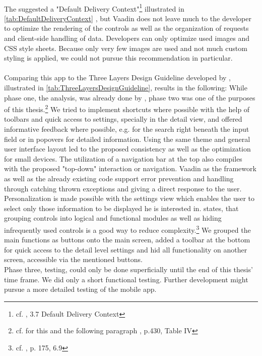 \\
The \cite{WorldWideWebConsortium.2008} suggested a "Default Delivery Context"\footnote{cf. \cite{WorldHealthOrganization.2011}, 3.7 Default Delivery Context} illustrated in \ref{tab:DefaultDeliveryContext} , but Vaadin does not leave much to the developer to optimize the rendering of the controls as well as the organization of requests and client-side handling of data. Developers can only optimize used images and CSS style sheets. Because only very few images are used and not much custom styling is applied, we could not pursue this recommendation in particular.
\\
\\
Comparing this app to the Three Layers Design Guideline developed by \cite{AyobNurulZakiahbinti.2009}, illustrated in \ref{tab:ThreeLayersDesignGuideline}, results in the following: While phase one, the analysis, was already done by \cite{Dehling.2012}, phase two was one of the purposes of this thesis.\footnote{cf. for this and the following paragraph \cite{AyobNurulZakiahbinti.2009}, p.430, Table IV} We tried to implement shortcuts where possible with the help of toolbars and quick access to settings, specially in the detail view, and offered informative feedback where possible, e.g. for the search right beneath the input field or in popovers for detailed information. Using the same theme and general user interface layout led to the proposed consistency as well as the optimization for small devices. The utilization of a navigation bar at the top also compiles with the proposed "top-down" interaction or navigation. Vaadin as the framework as well as the already existing code support error prevention and handling through catching thrown exceptions and giving a direct response to the user. Personalization is made possible with the settings view which enables the user to select only those information to be displayed he is interested in. \cite{Norman2002} states, that grouping controls into logical and functional modules as well as hiding infrequently used controls is a good way to reduce complexity.\footnote{cf. \cite{Norman2002}, p. 175, 6.9} We grouped the main functions as buttons onto the main screen, added a toolbar at the bottom for quick access to the detail level settings and hid all functionality on another screen, accessible via the mentioned buttons.
\\
Phase three, testing, could only be done superficially until the end of this thesis' time frame. We did only a short functional testing. Further development might pursue a more detailed testing of the mobile app.
